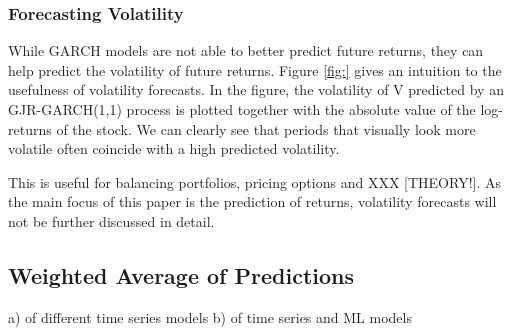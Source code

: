 \subsubsection{Forecasting Volatility}
While GARCH models are not able to better predict future returns, they can help predict the volatility of future returns. Figure \ref{fig:} gives an intuition to the usefulness of volatility forecasts. In the figure, the volatility of V predicted by an GJR-GARCH(1,1) process is plotted together with the absolute value of the log-returns of the stock. We can clearly see that periods that visually look more volatile often coincide with a high predicted volatility. 

This is useful for balancing portfolios, pricing options and XXX [THEORY!]. As the main focus of this paper is the prediction of returns, volatility forecasts will not be further discussed in detail. 




\subsection{Weighted Average of Predictions}
a) of different time series models
b) of time series and ML models






